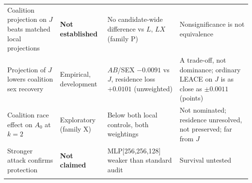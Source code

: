 \begin{tabular}{@{}p{4.0cm}p{2.5cm}p{3.7cm}p{4.9cm}@{}}
\addlinespace[1.5pt]
Coalition projection on $J$ beats matched local projections & \textbf{Not established} & No candidate-wide difference vs $L$, $LX$ (family P) & Nonsignificance is not equivalence \\
\addlinespace[1.5pt]
Projection of $J$ lowers coalition sex recovery & Empirical, development & $AB$/SEX $-0.0091$ vs $J$, residence loss $+0.0101$ (unweighted) & A trade-off, not dominance; ordinary LEACE on $J$ is as close as $\pm0.0011$ (points) \\
\addlinespace[1.5pt]
Coalition race effect on $A_0$ at $k{=}2$ & Exploratory (family X) & Below both local controls, both weightings & Not nominated; residence unresolved, not preserved; far from $J$ \\
\addlinespace[1.5pt]
Stronger attack confirms protection & \textbf{Not claimed} & MLP[256,256,128] weaker than standard audit & Survival untested \\
\addlinespace[1.5pt]
\bottomrule
\end{tabular}
